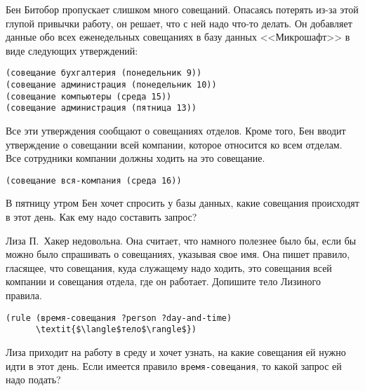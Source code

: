 \begin{exercise}{4.59}%
\label{EX4.59}%
Бен Битобор пропускает слишком много совещаний.
Опасаясь потерять из-за этой глупой привычки работу, он решает, что с
ней надо что-то делать.  Он добавляет данные обо всех еженедельных
совещаниях в базу данных <<Микрошафт>> в виде следующих утверждений:

\begin{Verbatim}[fontsize=\small]
(совещание бухгалтерия (понедельник 9))
(совещание администрация (понедельник 10))
(совещание компьютеры (среда 15))
(совещание администрация (пятница 13))
\end{Verbatim}
Все эти утверждения сообщают о совещаниях отделов.  Кроме того, Бен
вводит утверждение о совещании всей компании, которое относится ко
всем отделам.  Все сотрудники компании должны ходить на это совещание.

\begin{Verbatim}[fontsize=\small]
(совещание вся-компания (среда 16))
\end{Verbatim}

\begin{plainenum}
\item

В пятницу утром Бен хочет спросить у базы данных,
какие совещания происходят в этот день.  Как ему надо составить
запрос?

\item
 Лиза П.~Хакер недовольна.  Она считает, что
намного полезнее было бы, если бы можно было спрашивать о совещаниях,
указывая свое имя.  Она пишет правило, гласящее, что совещания,
куда служащему надо ходить, это совещания всей компании и совещания
отдела, где он работает.  Допишите тело Лизиного правила.

\begin{Verbatim}[fontsize=\small]
(rule (время-совещания ?person ?day-and-time)
      \textit{$\langle$тело$\rangle$})
\end{Verbatim}

\item
 Лиза приходит на работу в среду и хочет узнать,
на какие совещания ей нужно идти в этот день.  Если имеется правило
{\tt время-совещания}, то какой запрос ей надо подать?
\end{plainenum}
\end{exercise}

